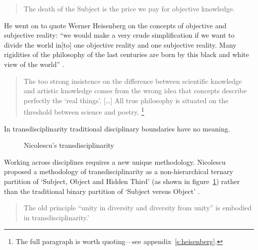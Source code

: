 \begin{quotation}
  The death of the Subject is the price we pay for objective knowledge. 
\end{quotation}

He went on to quote Werner Heisenberg on the concepts of objective and subjective reality: ``we would make a very crude simplification if we want to divide the world in[to] one objective reality and one subjective reality. Many rigidities of the philosophy of the last centuries are born by this black and white view of the world'' \autocite[Heisenberg, cited in][]{Nicolescu2010}.

\begin{quotation}
  The too strong insistence on the difference between scientific knowledge and artistic knowledge comes from the wrong idea that concepts describe perfectly the `real things'. [\ldots] All true philosophy is situated on the threshold between science and poetry.  \footnote{The full paragraph is worth quoting---see appendix~\ref{s:heisenberg}.}
\end{quotation}

In transdisciplinarity traditional disciplinary boundaries have no meaning.

\begin{figure}[!htbp]
\centering
  \caption[Nicolescu's transdisciplinarity]{Nicolescu's transdisciplinarity}
\label{fig:trans}
\end{figure}

Working across disciplines requires a new unique methodology. Nicolescu proposed a methodology of transdisciplinarity as a non-hierarchical ternary partition of `Subject, Object and Hidden Third' (as shown in figure~\ref{fig:trans}) rather than the traditional binary partition of `Subject versus Object' \autocite*{Nicolescu2010}.

\begin{quotation}
  The old principle ``unity in diversity and diversity from unity'' is embodied in transdisciplinarity.' 
\end{quotation}


